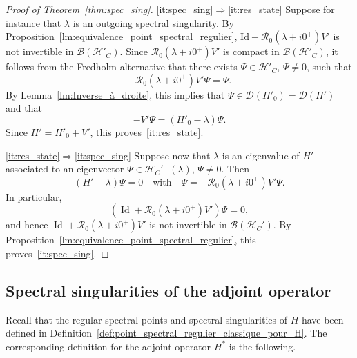 \documentclass[AHL,Unicode,longabstracts,published]{cedram}
\newcommand{\Hi}{\mathcal{H}}
\newcommand{\Res}{\mathcal{R}}
\newcommand{\clB}{\mathcal{B}}
\newcommand{\clD}{\mathcal{D}}
\DeclareMathOperator{\Id}{Id}
\newcommand{\Hi}{\mathcal{H}}
\begin{document}
\begin{proof}[Proof of Theorem~\ref{thm:spec_sing}] \eqref{it:spec_sing}$\Rightarrow$\eqref{it:res_state} Suppose for instance that $\lambda$ is an outgoing spectral singularity. By Proposition~\ref{lm:equivalence_point_spectral_regulier}, $\mathrm{Id}+\Res_0(\lambda+i0^+)V'$ is not invertible in $\clB(\Hi'_C)$. Since $\Res_0(\lambda+i0^+)V'$ is compact in $\clB(\Hi'_C)$, it follows from the Fredholm alternative that there exists $\Psi\in\Hi'_C$, $\Psi\neq0$, such that
\begin{equation}\label{eq:preuve_caracterisation_vecteur_propre_singularité_direct_non_inversible}
-\Res_0\left(\lambda+i0^+\right)V'\Psi=\Psi.
\end{equation}
By Lemma~\ref{lm:Inverse_à_droite}, this implies that $\Psi\in\clD(H'_0)=\clD(H')$ and that
\begin{equation}\label{eq:preuve_caracterisation_vecteur_propre_singularité_direct_non_inversible2}
-V'\Psi=(H'_0-\lambda)\Psi.
\end{equation}
Since $H'=H'_0+V'$, this proves~\eqref{it:res_state}.

\eqref{it:res_state}$\Rightarrow$\eqref{it:spec_sing} Suppose now that $\lambda$ is an eigenvalue of $H'$ associated to an eigenvector $\Psi\in\Hi_C'^+(\lambda)$, $\Psi\neq0$. Then
\begin{equation*}\label{eq:preuve_thm_caractérisation_sing_et_vp_ecriture_reciproque_ecriture_vp}
(H'-\lambda)\Psi=0 \quad \text{with}\quad \Psi=-\Res_0\left(\lambda+i0^+\right)V'\Psi.
\end{equation*}
In particular,
\begin{equation*}
(\Id+\Res_0(\lambda+i0^+)V')\Psi=0,
\end{equation*}
and hence $\Id+\Res_0(\lambda+i0^+)V'$ is not invertible in $\clB(\Hi_C')$. By Proposition~\ref{lm:equivalence_point_spectral_regulier}, this proves~\eqref{it:spec_sing}.
\end{proof}


\subsection{Spectral singularities of the adjoint operator}\label{sec:spec_sing_adjoint}

Recall that the regular spectral points and spectral singularities of $H$ have been defined in Definition~\ref{def:point_spectral_regulier_classique_pour_H}. The corresponding definition for the adjoint operator $H^*$ is the following.
\end{document}
